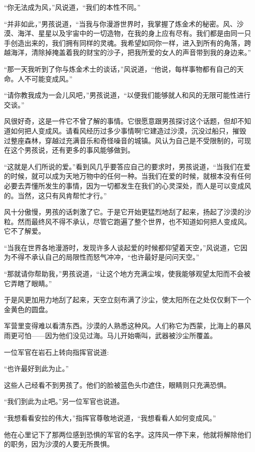 \documentclass[twoside,openany]{book}
\begin{document}
“你无法成为风，”风说道，“我们的本性不同。”

“并非如此，”男孩说道，“当我与你漫游世界时，我掌握了炼金术的秘密。风、沙漠、海洋、星星以及宇宙中的一切造物，在我的身上应有尽有。我们都是由同一只手创造出来的，我们拥有同样的灵魂。我希望如同你一样，进入到所有的角落，跨越海洋，清除掉掩盖着我的财宝的沙子，把我所爱的女人的声音带到我的身边来。”

“那一天我听到了你与炼金术士的谈话，”风说道，“他说，每样事物都有自己的天命。人不可能变成风。”

“请你教我成为一会儿风吧，”男孩说道，“以便我们能够就人和风的无限可能性进行交谈。”

风很好奇，这是一件它不曾了解的事情。它很愿意跟男孩探讨这个话题，但却不知道如何把人变成风。请看风经历过多少事情啊!它建造过沙漠，沉没过船只，摧毁过整座森林，穿越过充满音乐和奇怪噪音的城镇。风认为自己是不受限制的，可现在这个男孩说，还有更多的事风能够做到。

“这就是人们所说的爱。”看到风几乎要答应自己的要求时，男孩说道，“当我们在爱的时候，就可以成为天地万物中的任何一种。当我们在爱的时候，就根本没有任何必要去弄懂所发生的事情，因为一切都发生在我们的心灵深处，而人是可以变成风的。当然，这只有风肯帮忙才行。”

风十分傲慢，男孩的话刺激了它。于是它开始更猛烈地刮了起来，扬起了沙漠的沙粒。然而最终风不得不承认，尽管它跑遍了整个世界，也不知道如何把人变成风。它不了解爱。

“当我在世界各地漫游时，发现许多人谈起爱的时候都仰望着天空，”风说道，它因为不得不承认自己的局限性而怒气冲冲，“也许最好是问问天空。”

“那就请你帮助我，”男孩说道，“让这个地方充满尘埃，使我能够观望太阳而不会被它弄瞎了眼睛。”

于是风更加用力地刮了起来，天空立刻布满了沙尘，使太阳所在之处仅仅剩下一个金黄色的圆盘。

军营里变得难以看清东西。沙漠的人熟悉这种风。人们称它为西蒙，比海上的暴风雨更可怕——因为他们没见过海。马儿开始嘶叫，武器被沙尘所覆盖。

一位军官在岩石上转向指挥官说道:

“也许最好到此为止。”

这些人己经看不到男孩了。他们的脸被蓝色头巾遮住，眼睛则只充满恐惧。

“我们到此为止吧。”另一位军官也说道。

“我想看看安拉的伟大，”指挥官尊敬地说道，“我想看看人如何变成风。”

他在心里记下了那两位感到恐惧的军官的名字。这阵风一停下来，他就将解除他们的职务，因为沙漠的人要无所畏惧。
\end{document}
